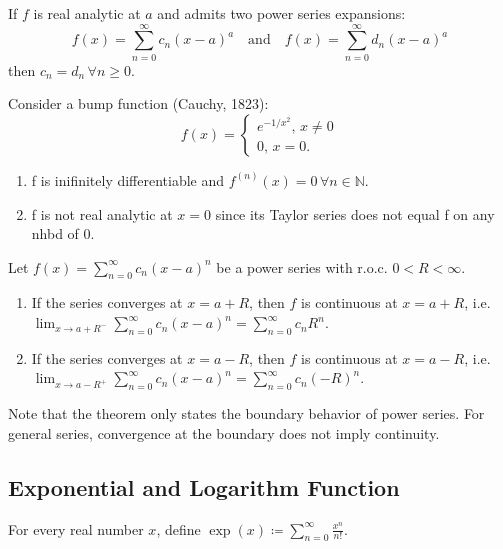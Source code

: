 \documentclass[12pt]{article}
\begin{document}
\begin{corollary}
    If $f$ is real analytic at $a$ and admits two power series expansions:
    \[f(x)=\sum_{n=0}^{\infty}c_n(x-a)^a\quad \text{and}\quad f(x)=\sum_{n=0}^{\infty}d_n(x-a)^a\]
    then $c_n = d_n\,\forall n\geq 0.$
\end{corollary}

\begin{example}
Consider a bump function (Cauchy, 1823):
\[f(x)=\begin{cases}
    e^{-1/x^2},\, x\neq 0\\
    0,\, x=0.
\end{cases}\]
\begin{enumerate}
    \item f is inifinitely differentiable and $f^{(n)}(x)=0\,\forall n\in\mathbb{N}.$
    \item f is not real analytic at $x=0$ since its Taylor series does not equal f on any nhbd of $0$.
\end{enumerate}
\end{example}

\begin{theorem}
    Let $f(x)=\sum_{n=0}^{\infty}c_n(x-a)^n$ be a power series with r.o.c. $0<R<\infty.$
    \begin{enumerate}
        \item If the series converges at $x=a+R$, then $f$ is continuous at $x=a+R$, i.e. $\lim_{x\rightarrow a+R^-}\sum_{n=0}^{\infty}c_n(x-a)^n = \sum_{n=0}^{\infty}c_n R^n.$
        \item If the series converges at $x=a-R$, then $f$ is continuous at $x=a-R$, i.e. $\lim_{x\rightarrow a-R^+}\sum_{n=0}^{\infty}c_n(x-a)^n = \sum_{n=0}^{\infty}c_n (-R)^n.$
    \end{enumerate}
\end{theorem}

Note that the theorem only states the boundary behavior of power series.
For general series, convergence at the boundary does not imply continuity.


\subsection*{Exponential and Logarithm Function}


\begin{definition}
    For every real number $x$, define $\exp(x)\coloneq \sum_{n=0}^{\infty}\frac{x^n}{n!}$.
\end{definition}
\end{document}
